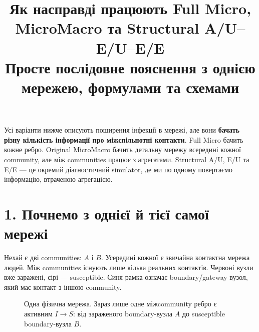 \documentclass[11pt,a4paper]{article}
\title{\textbf{Як насправді працюють Full Micro, MicroMacro та Structural A/U--E/U--E/E}\\[4pt]
\large Просте послідовне пояснення з однією мережею, формулами та схемами}
\author{}
\date{}
\begin{document}
\maketitle
\vspace{-1.5em}

\begin{tcolorbox}[colback=soft,colframe=boundary,title=Що треба зрозуміти з цього тексту]
Усі варіанти нижче описують поширення інфекції в мережі, але вони \textbf{бачать різну кількість інформації про міжспільнотні контакти}. Full Micro бачить кожне ребро. Original MicroMacro бачить детальну мережу всередині кожної community, але між communities працює з агрегатами. Structural A/U, E/U та E/E --- це окремий діагностичний simulator, де ми по одному повертаємо інформацію, втраченою агрегацією.
\end{tcolorbox}

\section*{1. Почнемо з однієї й тієї самої мережі}

Нехай є дві communities: $A$ і $B$. Усередині кожної є звичайна контактна мережа людей. Між communities існують лише кілька реальних контактів. Червоні вузли вже заражені, сірі --- susceptible. Синя рамка означає boundary/gateway-вузол, який має контакт з іншою community.

\begin{figure}[h!]
\centering
{}
\caption{Одна фізична мережа. Зараз лише одне міжcommunity ребро є активним $I\to S$: від зараженого boundary-вузла $A$ до susceptible boundary-вузла $B$.}
\end{figure}
\end{document}
